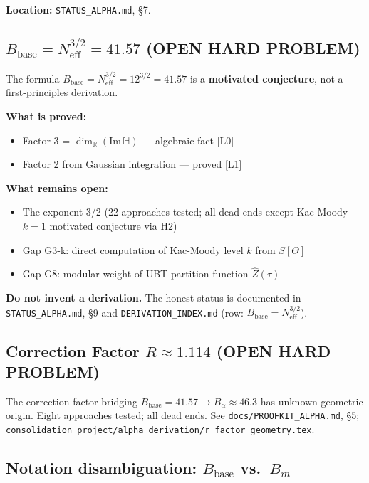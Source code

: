 \documentclass[11pt,a4paper]{article}
\begin{document}
\textbf{Location:} \texttt{STATUS\_ALPHA.md}, §7.

\subsection{\texorpdfstring{$B_\text{base} = N_\text{eff}^{3/2} = 41.57$}{B\_base} (OPEN HARD PROBLEM)}

\begin{tcolorbox}[colback=orange!10!white,colframe=orange!75!black,title=Open Hard Problem: $B_\text{base}$]
The formula $B_\text{base} = N_\text{eff}^{3/2} = 12^{3/2} = 41.57$ is a
\textbf{motivated conjecture}, not a first-principles derivation.

\textbf{What is proved:}
\begin{itemize}
  \item Factor 3 = $\dim_\mathbb{R}(\mathrm{Im}\,\mathbb{H})$ — algebraic fact [L0]
  \item Factor 2 from Gaussian integration — proved [L1]
\end{itemize}

\textbf{What remains open:}
\begin{itemize}
  \item The exponent 3/2 (22 approaches tested; all dead ends except
        Kac-Moody $k=1$ motivated conjecture via H2)
  \item Gap G3-k: direct computation of Kac-Moody level $k$ from $S[\Theta]$
  \item Gap G8: modular weight of UBT partition function $\hat{Z}(\tau)$
\end{itemize}

\textbf{Do not invent a derivation.} The honest status is documented in
\texttt{STATUS\_ALPHA.md}, §9 and
\texttt{DERIVATION\_INDEX.md} (row: $B_\text{base} = N_\text{eff}^{3/2}$).
\end{tcolorbox}

\subsection{Correction Factor \texorpdfstring{$R \approx 1.114$}{R} (OPEN HARD PROBLEM)}

The correction factor bridging $B_\text{base} = 41.57 \to B_\alpha \approx 46.3$
has unknown geometric origin. Eight approaches tested; all dead ends.
See \texttt{docs/PROOFKIT\_ALPHA.md}, §5;
\texttt{consolidation\_project/alpha\_derivation/r\_factor\_geometry.tex}.

\subsection{Notation disambiguation: \texorpdfstring{$B_\text{base}$ vs.\ $B_m$}{B\_base vs B\_m}}
\end{document}
